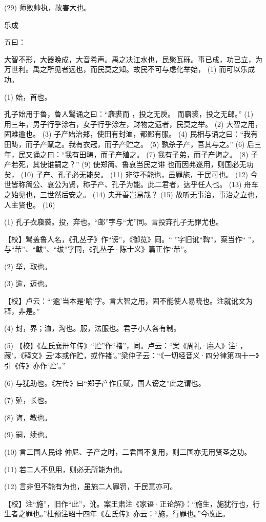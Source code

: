 \documentclass[12pt,UTF8]{ctexbook}
\begin{document}
(29) 师败帅执，故害大也。





乐成


五曰：

大智不形，大器晚成，大音希声。禹之决江水也，民聚瓦砾。事已成，功已立，为万世利。禹之所见者远也，而民莫之知。故民不可与虑化举始， (1) 而可以乐成功。

(1) 始，首也。

孔子始用于鲁，鲁人鹥诵之曰：“麛裘而 ，投之无戾。 而麛裘，投之无邮。” (1) 用三年，男子行乎涂右，女子行乎涂左，财物之遗者，民莫之举。 (2) 大智之用，固难逾也。 (3) 子产始治郑，使田有封洫，都鄙有服。 (4) 民相与诵之曰：“我有田畴，而子产赋之。我有衣冠，而子产贮之。 (5) 孰杀子产，吾其与之。” (6) 后三年，民又诵之曰：“我有田畴，而子产殖之。 (7) 我有子弟，而子产诲之。 (8) 子产若死，其使谁嗣之？” (9) 使郑简、鲁哀当民之诽 也而因弗遂用，则国必无功矣， (10) 子产、孔子必无能矣。 (11) 非徒不能也，虽罪施，于民可也。 (12) 今世皆称简公、哀公为贤，称子产、孔子为能。此二君者，达乎任人也。 (13) 舟车之始见也，三世然后安之。 (14) 夫开善岂易哉？ (15) 故听无事治，事治之立也，人主贤也。 (16)

(1) 孔子衣麛裘。投，弃也。“邮”字与“尤”同。言投弃孔子无罪尤也。

【校】鹥盖鲁人名，《孔丛子》作“谤”，《御览》同。“ ”字旧讹“鞞”，案当作“ ”，与“芾”、“韍”、“绂”字同，《孔丛子·陈士义》篇正作“芾”。

(2) 举，取也。

(3) 逾，迈也。

【校】卢云：“‘逾’当本是‘喻’字。言大智之用，固不能使人易晓也。注就讹文为释，非是。”

(4) 封，界；洫，沟也。服，法服也。君子小人各有制。

(5) 【校】《左氏襄卅年传》“贮”作“褚”，同。卢云：“案《周礼·廛人》注‘ ，藏’，《释文》云‘本或作贮，或作褚’。”梁仲子云：“《一切经音义·四分律第四十一》引《传》亦作‘贮’。”

(6) 与犹助也。《左传》曰“郑子产作丘赋，国人谤之”此之谓也。

(7) 殖，长也。

(8) 诲，教也。

(9) 嗣，续也。

(10) 言二国人民诽 仲尼、子产之时，二君国不复用，则二国亦无用贤圣之功。

(11) 若二人不见用，则必无所能为也。

(12) 言非但不能有为也，虽施二人罪罚，于民意亦可。

【校】注“施”，旧作“此”，讹。案王肃注《家语·正论解》：“施生，施犹行也，行生者之罪也。”杜预注昭十四年《左氏传》亦云：“施，行罪也。”今改正。
\end{document}
